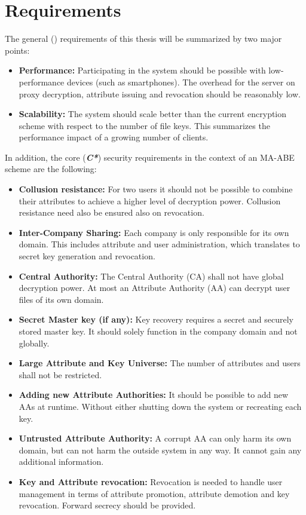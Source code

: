 \chapter{Requirements}
\label{sec:requirements}
The general () requirements of this thesis will be summarized by two major points: 

\begin{itemize}
	\item[\req{B1}] \textbf{Performance:} Participating in the system should be possible with low-performance devices (such as smartphones). The overhead for the server on proxy decryption, attribute issuing and revocation should be reasonably low.  
	\item[\req{B2}] \textbf{Scalability:} The system should scale better than the current encryption scheme with respect to the number of file keys. This summarizes the performance impact of a growing number of clients.
\end{itemize}

In addition, the core (\textbf{\textit{C*}}) security requirements in the context of an \ac{MA-ABE} scheme are the following:
\begin{itemize}
\item[\req{C1}] \textbf{Collusion resistance:} For two users it should not be possible to combine their attributes to achieve a higher level of decryption power. Collusion resistance need also be ensured also on revocation. 
\item[\req{C2}] \textbf{Inter-Company Sharing:} Each company is only responsible for its own domain. This includes attribute and user administration, which translates to secret key generation and revocation. 
\item[\req{C3}] \textbf{Central Authority:} The Central Authority (\ac{CA}) shall not have global decryption power. At most an Attribute Authority (\ac{AA}) can decrypt user files of its own domain.  
\item[\req{C4}] \textbf{Secret Master key (if any):} Key recovery requires a secret and securely stored master key. It should solely function in the company domain and not globally. 
\item[\req{C5}] \textbf{Large Attribute and Key Universe:} The number of attributes and users shall not be restricted.
\item[\req{C6}] \textbf{Adding new Attribute Authorities:} It should be possible to add new AAs at runtime. Without either shutting down the system or recreating each key.
\item[\req{C7}] \textbf{Untrusted Attribute Authority:} A corrupt AA can only harm its own domain, but can not harm the outside system in any way. It cannot gain any additional information.
\item[\req{C8}] \textbf{Key and Attribute revocation:} Revocation is needed to handle user management in terms of attribute promotion, attribute demotion and key revocation. Forward secrecy should be provided.
\end{itemize}

